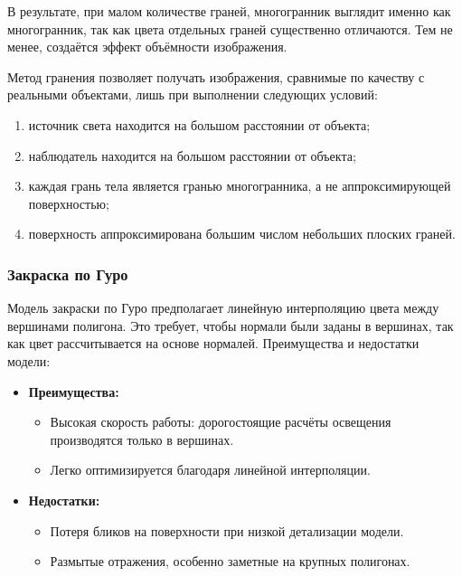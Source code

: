 В результате, при малом количестве граней, многогранник выглядит именно как многогранник, так как цвета отдельных граней существенно отличаются. Тем не менее, создаётся эффект объёмности изображения.

Метод гранения позволяет получать изображения, сравнимые по качеству с реальными объектами, лишь при выполнении следующих условий:

\begin{enumerate}
    \item источник света находится на большом расстоянии от объекта;
    \item наблюдатель находится на большом расстоянии от объекта;
    \item каждая грань тела является гранью многогранника, а не аппроксимирующей поверхностью;
    \item поверхность аппроксимирована большим числом небольших плоских граней.~\cite{graneniya}
\end{enumerate}



\subsubsection{Закраска по Гуро}

\hspace{1.25cm}
Модель закраски по Гуро предполагает линейную интерполяцию цвета между вершинами полигона. Это требует, чтобы нормали были заданы в вершинах, так как цвет рассчитывается на основе нормалей. Преимущества и недостатки модели:

\begin{itemize}
    \item \textbf{Преимущества:}
    \begin{itemize}
        \item Высокая скорость работы: дорогостоящие расчёты освещения производятся только в вершинах.
        \item Легко оптимизируется благодаря линейной интерполяции.
    \end{itemize}
    \item \textbf{Недостатки:}
    \begin{itemize}
        \item Потеря бликов на поверхности при низкой детализации модели.
        \item Размытые отражения, особенно заметные на крупных полигонах.
    \end{itemize}
\end{itemize}

